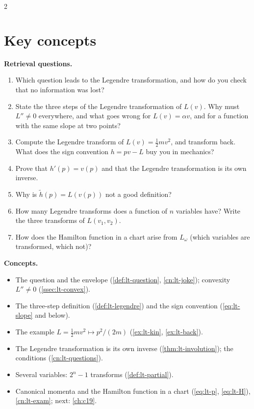 \begin{paracol}{2}
\section*{Key concepts}
\begin{keyconcepts}
\textbf{Retrieval questions.}
\begin{enumerate}
  \item Which question leads to the Legendre transformation, and how do you check that no information was lost?
  \item State the three steps of the Legendre transformation of $L(v)$. Why must $L''\neq0$ everywhere, and what goes wrong for $L(v)=\alpha v$, and for a function with the same slope at two points?
  \item Compute the Legendre transform of $L(v)=\tfrac12mv^2$, and transform back. What does the sign convention $h=pv-L$ buy you in mechanics?
  \item Prove that $h'(p)=v(p)$ and that the Legendre transformation is its own inverse.
  \item Why is $\tilde h(p)=L(v(p))$ not a good definition?
  \item How many Legendre transforms does a function of $n$ variables have? Write the three transforms of $L(v_1,v_2)$.
  \item How does the Hamilton function in a chart arise from $L_\omega$ (which variables are transformed, which not)?
\end{enumerate}
\textbf{Concepts.}
\begin{itemize}
  \item The question and the envelope (\cref{def:lt-question}, \cref{cn:lt-joke}); convexity $L''\neq0$ (\cref{ssec:lt-convex}).
  \item The three-step definition (\cref{def:lt-legendre}) and the sign convention (\eqref{eq:lt-slope} and below).
  \item The example $L=\tfrac12mv^2\mapsto p^2/(2m)$ (\cref{ex:lt-kin}, \cref{ex:lt-back}).
  \item The Legendre transformation is its own inverse (\cref{thm:lt-involution}); the conditions (\cref{cn:lt-questions}).
  \item Several variables: $2^n-1$ transforms (\cref{def:lt-partial}).
  \item Canonical momenta and the Hamilton function in a chart (\eqref{eq:lt-p}, \eqref{eq:lt-H}), \cref{cn:lt-exam}; next: \cref{ch:c19}.
\end{itemize}
\end{keyconcepts}

\flushside
\end{paracol}
